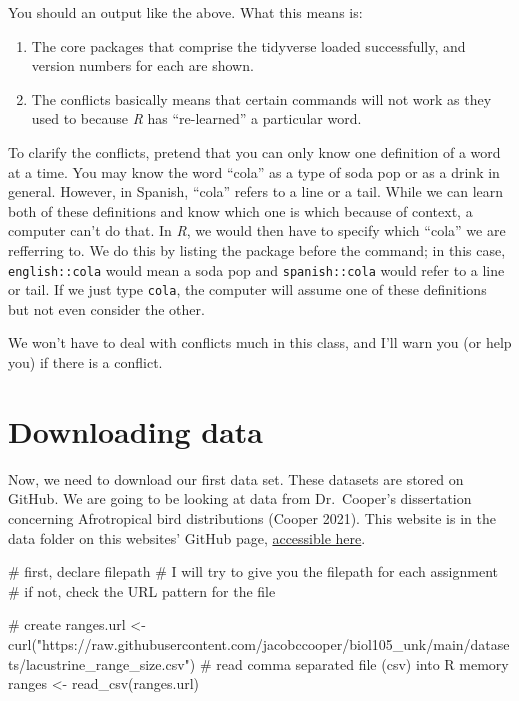\documentclass[
  letterpaper,
  DIV=11,
  numbers=noendperiod]{scrreprt}
\newenvironment{Shaded}{\begin{snugshade}}{\end{snugshade}}
\newcommand{\CommentTok}[1]{\textcolor[rgb]{0.37,0.37,0.37}{#1}}
\newcommand{\FunctionTok}[1]{\textcolor[rgb]{0.28,0.35,0.67}{#1}}
\newcommand{\NormalTok}[1]{\textcolor[rgb]{0.00,0.23,0.31}{#1}}
\newcommand{\OtherTok}[1]{\textcolor[rgb]{0.00,0.23,0.31}{#1}}
\newcommand{\StringTok}[1]{\textcolor[rgb]{0.13,0.47,0.30}{#1}}
\providecommand{\tightlist}{%
  \setlength{\itemsep}{0pt}\setlength{\parskip}{0pt}}\usepackage{longtable,booktabs,array}
\begin{document}
You should an output like the above. What this means is:

\begin{enumerate}
\def\labelenumi{\arabic{enumi}.}
\tightlist
\item
  The core packages that comprise the tidyverse loaded successfully, and
  version numbers for each are shown.
\item
  The conflicts basically means that certain commands will not work as
  they used to because \emph{R} has ``re-learned'' a particular word.
\end{enumerate}

To clarify the conflicts, pretend that you can only know one definition
of a word at a time. You may know the word ``cola'' as a type of soda
pop or as a drink in general. However, in Spanish, ``cola'' refers to a
line or a tail. While we can learn both of these definitions and know
which one is which because of context, a computer can't do that. In
\emph{R}, we would then have to specify which ``cola'' we are refferring
to. We do this by listing the package before the command; in this case,
\texttt{english::cola} would mean a soda pop and \texttt{spanish::cola}
would refer to a line or tail. If we just type \texttt{cola}, the
computer will assume one of these definitions but not even consider the
other.

We won't have to deal with conflicts much in this class, and I'll warn
you (or help you) if there is a conflict.

\section{Downloading data}\label{downloading-data}

Now, we need to download our first data set. These datasets are stored
on GitHub. We are going to be looking at data from Dr.~Cooper's
dissertation concerning Afrotropical bird distributions (Cooper 2021).
This website is in the data folder on this websites' GitHub page,
\href{https://github.com/jacobccooper/biol105_unk/blob/main/datasets/lacustrine_range_size.csv}{accessible
here}.

\begin{Shaded}
\begin{Highlighting}[]
\CommentTok{\# first, declare filepath}
\CommentTok{\# I will try to give you the filepath for each assignment}
\CommentTok{\# if not, check the URL pattern for the file}

\CommentTok{\# create}
\NormalTok{ranges.url }\OtherTok{\textless{}{-}} \FunctionTok{curl}\NormalTok{(}\StringTok{"https://raw.githubusercontent.com/jacobccooper/biol105\_unk/main/datasets/lacustrine\_range\_size.csv"}\NormalTok{)}
\CommentTok{\# read comma separated file (csv) into R memory}
\NormalTok{ranges }\OtherTok{\textless{}{-}} \FunctionTok{read\_csv}\NormalTok{(ranges.url)}
\end{Highlighting}
\end{Shaded}
\end{document}

